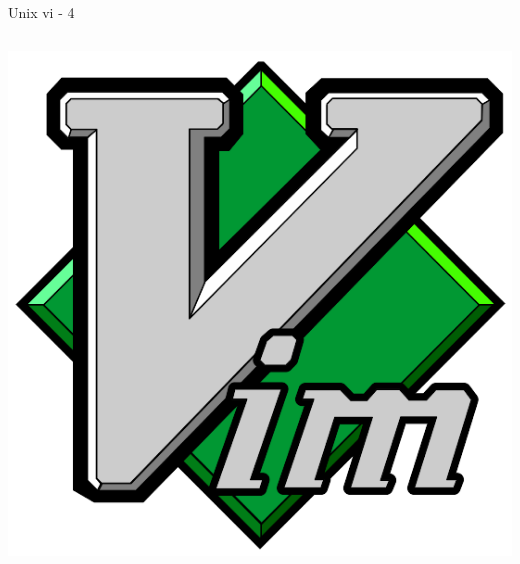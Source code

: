 \documentclass[unknownkeysallowed, 10pt, a4 paper, handout]{beamer}
\begin{document}
\begin{frame}[label=vim4]{Unix vi - 4}
\begin{columns}[T]
\begin{column}{.25\textwidth}
      \includegraphics[scale=0.08]{pics/vim.png}
    \end{column}
  \end{columns}
\end{frame}
\end{document}
